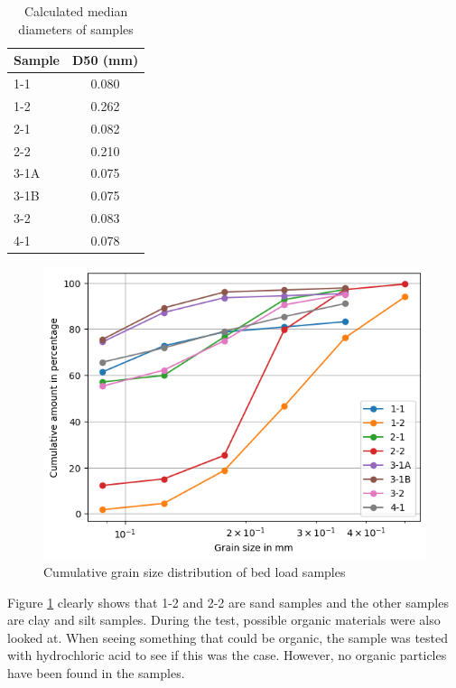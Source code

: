 \begin{table}[H]
    \centering
    \renewcommand{\arraystretch}{1.2} %
    \setlength{\tabcolsep}{8pt}       %
    \caption{Calculated median diameters of samples}
    \begin{tabular}{lc}
        \toprule
        Sample & D50 (mm) \\
        \midrule
        1-1  & 0.080     \\
        1-2  & 0.262     \\
        2-1  & 0.082     \\
        2-2  & 0.210     \\
        3-1A & 0.075     \\
        3-1B & 0.075     \\
        3-2  & 0.083     \\
        4-1  & 0.078     \\
        \bottomrule
    \end{tabular}
    \label{tab:d50}
\end{table}

\begin{figure}[H]
    \centering
    \includegraphics[width=0.75\linewidth]{figures//ch6/CUMU.png}
    \caption{Cumulative grain size distribution of bed load samples}
    \label{fig:Cumu}
\end{figure}

Figure \ref{fig:Cumu} clearly shows that 1-2 and 2-2 are sand samples and the other samples are clay and silt samples. During the test, possible organic materials were also looked at. When seeing something that could be organic, the sample was tested with hydrochloric acid to see if this was the case. However, no organic particles have been found in the samples. 

